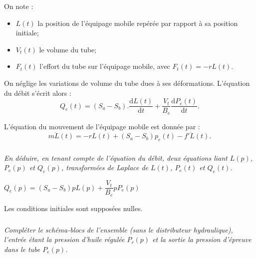 \ifprof
\else


On note :
\begin{itemize}
	\item $L(t)$ la position de l’équipage mobile repérée par rapport à sa position initiale;
	\item $V_t(t)$ le volume du tube;
	\item $F_t(t)$ l’effort du tube sur l’équipage mobile, avec $F_t(t) = - rL(t)$.
\end{itemize}

On néglige les variations de volume du tube dues à ses déformations. L’équation du débit s’écrit alors :
	$$Q_e (t)=(S_a-S_b ).\dfrac{\text{d}L(t)}{\text{d}t}+\dfrac{V_t}{B_e}  \dfrac{\text{d}P_e (t)}{\text{d}t}.$$


L’équation du mouvement de l’équipage mobile est donnée par : 
$$
m\ddot{L}(t)=-rL(t)+\left(S_a-S_b \right)p_e(t)-f'\dot{L}(t).
$$

\fi
\subparagraph{}
\textit{En déduire, en tenant compte de l’équation du débit, deux équations liant $L(p)$, $P_e(p)$ et $Q_e(p)$, transformées de Laplace de $L(t)$, $P_e(t)$ et $Q_e(t)$. }
\ifprof
\begin{corrige}
	$Q_e (p)=(S_a-S_b )p L(p)+\dfrac{V_t}{B_e}  p P_e(p)$
\end{corrige}
\else
\fi
Les conditions initiales sont supposées nulles.

\subparagraph{}
\textit{Compléter le schéma-blocs de l’ensemble (sans le distributeur hydraulique), l’entrée étant la pression d’huile régulée $P_r(p)$ et la sortie la pression d’épreuve dans le tube $P_e(p)$.}
\ifprof
\begin{corrige}
\end{corrige}
\else
\fi


\begin{center}
\end{center}
